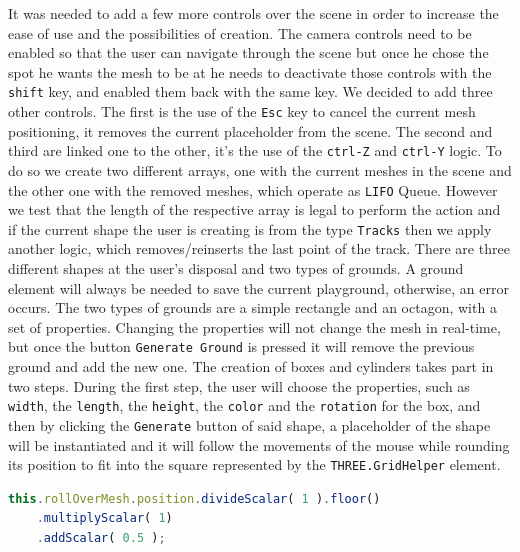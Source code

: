 \documentclass{scrbook}
\begin{document}
It was needed to add a few more controls over the scene in order to increase the ease of use and the possibilities of creation. The camera controls need to be enabled so that the user can navigate through the scene but once he chose the spot he wants 
the mesh to be at he needs to deactivate those controls with the \texttt{shift} key, and enabled them back with the same key. We decided to add three other controls. The first is the use of the \texttt{Esc} key to cancel the current mesh positioning, it removes the current placeholder from the scene. 
The second and third are linked one to the other, it's the use of the \texttt{ctrl-Z} and \texttt{ctrl-Y} logic. To do so we create two different arrays, one with the current meshes in the scene and the other one with the removed meshes, which operate as \texttt{LIFO} Queue.
However we test that the length of the respective array is legal to perform the action and if the current shape the user is creating is from the type \texttt{Tracks} then we apply another logic, which removes/reinserts the last point of the track.
There are three different shapes at the user's disposal and two types of grounds. A ground element will always be needed to save the current playground, otherwise, an error occurs. The two types of grounds are a simple rectangle and an octagon, with a set of properties. 
Changing the properties will not change the mesh in real-time, but once the button \texttt{Generate Ground} is pressed it will remove the previous ground and add the new one. The creation of boxes and cylinders takes part in two steps. 
During the first step, the user will choose the properties, such as \texttt{width}, the \texttt{length}, the \texttt{height}, the \texttt{color} and the \texttt{rotation} for the box, and then by clicking the \texttt{Generate} button of said shape, 
a placeholder of the shape will be instantiated and it will follow the movements of the mouse while rounding its position to fit into the square represented by the \texttt{THREE.GridHelper} element. 

\begin{lstlisting}[language=JavaScript, gobble=2, basicstyle=\ttfamily\small]
  this.rollOverMesh.position.divideScalar( 1 ).floor()
    .multiplyScalar( 1)
    .addScalar( 0.5 );
\end{lstlisting} 
\end{document}
